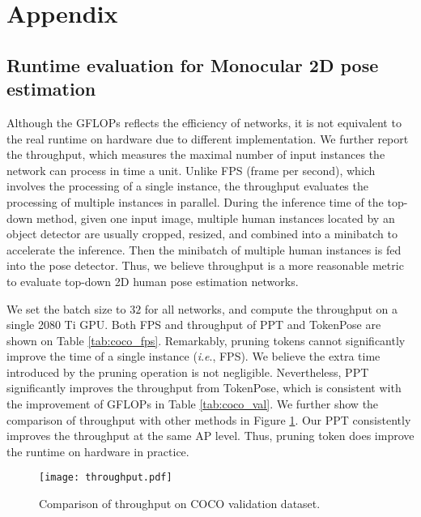 \documentclass[runningheads]{llncs}
\newcommand{\ie}{\textit{i}.\textit{e}., }
\begin{document}
\section{Appendix}
\subsection{Runtime evaluation for Monocular 2D pose estimation}
Although the GFLOPs reflects the efficiency of networks, it is not equivalent to the real runtime on hardware due to different implementation. 
We further report the throughput, which measures the maximal number of input instances the network can process in time a unit. 
Unlike FPS (frame per second), which involves the processing of a single instance, the throughput evaluates the processing of multiple instances in parallel. 
During the inference time of the top-down method, given one input image, multiple human instances located by an object detector are usually cropped, resized, and combined into a minibatch to accelerate the inference. Then the minibatch of multiple human instances is fed into the pose detector. 
Thus, we believe throughput is a more reasonable metric to evaluate top-down 2D human pose estimation networks. 


We set the batch size to $32$ for all networks, and compute the throughput on a single 2080 Ti GPU. Both FPS and throughput of PPT and TokenPose \cite{li2021tokenpose} are shown on Table \ref{tab:coco_fps}. 
Remarkably, pruning tokens cannot significantly improve the time of a single instance (\ie FPS). We believe the extra time introduced by the pruning operation is not negligible. 
Nevertheless, PPT significantly improves the throughput from TokenPose, which is consistent with the improvement of GFLOPs in Table \ref{tab:coco_val}. 
We further show the comparison of throughput with other methods in Figure \ref{fig:throughput}. Our PPT consistently improves the throughput at the same AP level. 
Thus, pruning token does improve the runtime on hardware in practice. 


\begin{table}[h]
\centering
{}
\caption{ \small{FPS and Throughput on COCO validation dataset. } }
\label{tab:coco_fps}
\end{table}







\begin{figure}[t]
    \centering
    \texttt{[image: throughput.pdf]}
    \caption{\small{Comparison of throughput on COCO validation dataset. }  }
    \label{fig:throughput}
\end{figure}
\end{document}
